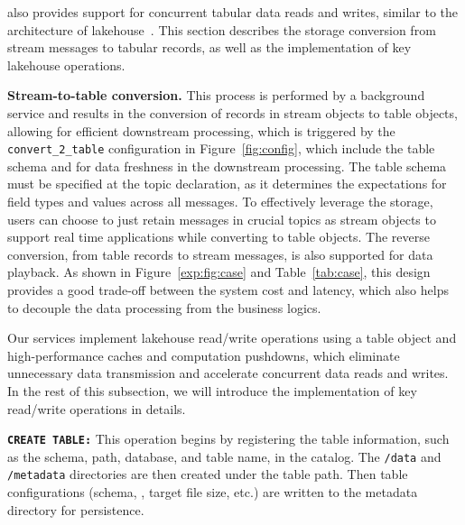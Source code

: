  \sys also provides support for concurrent tabular data reads and writes, similar to  the architecture of lakehouse~\cite{}.
  This section  describes the storage conversion from stream messages to tabular records, as well as the implementation of key lakehouse operations.


\noindent \textbf{Stream-to-table conversion.} This process is performed by a background service and results in the conversion of records in stream objects to table objects, allowing for efficient downstream processing, which is triggered by the \texttt{convert\_2\_table} configuration in Figure~\ref{fig:config}, which include the table schema and  for data freshness in the downstream processing.  The table schema must be specified at the topic declaration, as it determines the expectations for field types and values across all messages.  To effectively leverage the storage, users  can choose to just retain messages in crucial topics as stream objects  to support real time applications while converting  to table objects.  The reverse conversion, from table records to stream messages, is also supported for data playback. As shown in Figure~\ref{exp:fig:case} and Table~\ref{tab:case}, this design provides a good trade-off  between the system cost and latency, which also  helps to decouple the data processing from the business logics.




Our \sys services implement lakehouse read/write operations using a table object and high-performance caches and computation pushdowns, which eliminate unnecessary data transmission and accelerate concurrent data reads and writes. In the rest of this subsection, we will introduce the implementation of key read/write operations in details.

\noindent \textbf{\texttt{CREATE TABLE:}} This operation begins by registering the table information, such as the schema, path, database, and table name, in the catalog. The \texttt{/data} and \texttt{/metadata} directories are then created under the table path. Then table configurations (schema, , target file size, etc.) are written to the metadata directory for persistence.



